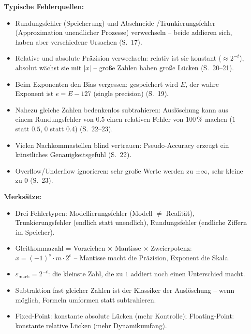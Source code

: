 \begin{merkbox}
\textbf{Typische Fehlerquellen:}
\begin{itemize}[itemsep=1pt]
  \item Rundungsfehler (Speicherung) und Abschneide-/Trunkierungsfehler (Approximation unendlicher Prozesse) verwechseln -- beide addieren sich, haben aber verschiedene Ursachen (S.~17).
  \item Relative und absolute Präzision verwechseln: relativ ist sie konstant ($\approx 2^{-t}$), absolut wächst sie mit $|x|$ -- große Zahlen haben große Lücken (S.~20--21).
  \item Beim Exponenten den Bias vergessen: gespeichert wird $E$, der wahre Exponent ist $e = E - 127$ (single precision) (S.~19).
  \item Nahezu gleiche Zahlen bedenkenlos subtrahieren: Auslöschung kann aus einem Rundungsfehler von $0.5$ einen relativen Fehler von 100\,\% machen ($1$ statt $0.5$, $0$ statt $0.4$) (S.~22--23).
  \item Vielen Nachkommastellen blind vertrauen: Pseudo-Accuracy erzeugt ein künstliches Genauigkeitsgefühl (S.~22).
  \item Overflow/Underflow ignorieren: sehr große Werte werden zu $\pm\infty$, sehr kleine zu $0$ (S.~23).
\end{itemize}
\textbf{Merksätze:}
\begin{itemize}[itemsep=1pt]
  \item Drei Fehlertypen: Modellierungsfehler (Modell $\neq$ Realität), Trunkierungsfehler (endlich statt unendlich), Rundungsfehler (endliche Ziffern im Speicher).
  \item Gleitkommazahl = Vorzeichen $\times$ Mantisse $\times$ Zweierpotenz: $x = (-1)^s \cdot m \cdot 2^e$ -- Mantisse macht die Präzision, Exponent die Skala.
  \item $\varepsilon_{\text{mach}} = 2^{-t}$: die kleinste Zahl, die zu $1$ addiert noch einen Unterschied macht.
  \item Subtraktion fast gleicher Zahlen ist der Klassiker der Auslöschung -- wenn möglich, Formeln umformen statt subtrahieren.
  \item Fixed-Point: konstante absolute Lücken (mehr Kontrolle); Floating-Point: konstante relative Lücken (mehr Dynamikumfang).
\end{itemize}
\end{merkbox}
